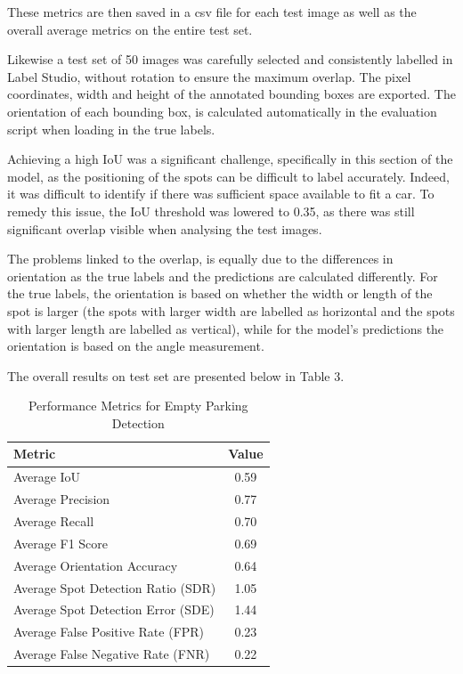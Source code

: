 These metrics are then saved in a csv file for each test image as well as the
overall average metrics on the entire test set.

\newpage{}

Likewise a test set of 50 images was carefully selected and consistently
labelled in Label Studio, without rotation to ensure the maximum overlap. The
pixel coordinates, width and height of the annotated bounding boxes are
exported. The orientation of each bounding box, is calculated automatically in
the evaluation script when loading in the true labels.

Achieving a high IoU was a significant challenge, specifically in this section
of the model, as the positioning of the spots can be difficult to label
accurately. Indeed, it was difficult to identify if there was sufficient space
available to fit a car. To remedy this issue, the IoU threshold was lowered to
0.35, as there was still significant overlap visible when analysing the test
images.

The problems linked to the overlap, is equally due to the differences in
orientation as the true labels and the predictions are calculated differently.
For the true labels, the orientation is based on whether the width or length of
the spot is larger (the spots with larger width are labelled as horizontal and
the spots with larger length are labelled as vertical), while for the model's
predictions the orientation is based on the angle measurement.

The overall results on test set are presented below in Table 3.

\begin{table}[htbp]
  \centering
  \begin{tabular}{|l|c|}
    \hline
    \textbf{Metric}                    & \textbf{Value} \\ \hline
    Average IoU                        & 0.59           \\ \hline
    Average Precision                  & 0.77           \\ \hline
    Average Recall                     & 0.70           \\ \hline
    Average F1 Score                   & 0.69           \\ \hline
    Average Orientation Accuracy       & 0.64           \\ \hline
    Average Spot Detection Ratio (SDR) & 1.05           \\ \hline
    Average Spot Detection Error (SDE) & 1.44           \\ \hline
    Average False Positive Rate (FPR)  & 0.23           \\ \hline
    Average False Negative Rate (FNR)  & 0.22           \\ \hline
  \end{tabular}
  \caption{Performance Metrics for Empty Parking Detection}
  \label{tab:metrics2}
\end{table}

